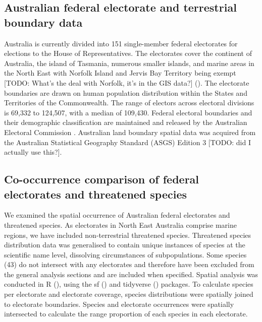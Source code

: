 \documentclass[a4paper,11pt]{article}
\begin{document}
\subsection{Australian federal electorate and terrestrial boundary data}

Australia is currently divided into 151 single-member federal electorates for elections to the House of Representatives. The electorates cover the continent of Australia, the island of Tasmania, numerous smaller islands, and marine areas in the North East with Norfolk Island and Jervis Bay Territory being exempt [TODO: What's the deal with Norfolk, it's in the GIS data?] (\cite{parliamentofaustraliaElectoralDivisions2018}). The electorate boundaries are drawn on human population distribution within the States and Territories of the Commonwealth. The range of electors across electoral divisions is 69,332 to 124,507, with a median of 109,430. Federal electoral boundaries and their demographic classification are maintained and released by the Australian Electoral Commission \cite{australiaelectoralcomissionFederalElectoralBoundaries2019}. Australian land boundary spatial data was acquired from the Australian Statistical Geography Standard (ASGS) Edition 3 \cite{australianbureauofstatisticsAustralianStatisticalGeography2021} [TODO: did I actually use this?].

\subsection{Co-occurrence comparison of federal electorates and threatened species}
We examined the spatial occurrence of Australian federal electorates and threatened species. As electorates in North East Australia comprise marine regions, we have included non-terrestrial threatened species. Threatened species distribution data was generalised to contain unique instances of species at the scientific name level, dissolving circumstances of subpopulations. Some species (43) do not intersect with any electorates and therefore have been excluded from the general analysis sections and are included when specified. Spatial analysis was conducted in R (\cite{rcoreteamLanguageEnvironmentStatistical2021}), using the sf (\cite{pebesmaSimpleFeaturesStandardized2018}) and tidyverse (\cite{wickhamWelcomeTidyverse2019}) packages. To calculate species per electorate and electorate coverage, species distributions were spatially joined to electorate boundaries. Species and electorate occurrences were spatially intersected to calculate the range proportion of each species in each electorate.
\end{document}
